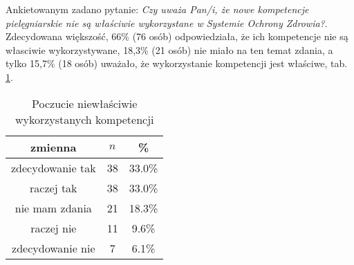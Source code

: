 
Ankietowanym zadano pytanie: \textit{Czy uważa Pan/i, że nowe kompetencje pielęgniarskie nie są właściwie wykorzystane w Systemie Ochrony Zdrowia?}.
Zdecydowana większość, 66\% (76 osób) odpowiedziała, że ich kompetencje nie są własciwie wykorzystywane, 18,3\% (21 osób) nie miało na ten temat zdania, a tylko 15,7\% (18 osób) uważało, że wykorzystanie kompetencji jest właściwe, tab. \ref{tab:Q21}.

\begin{table}[H]
\caption{Poczucie niewłaściwie wykorzystanych kompetencji}
\centering
\begin{tabular}{ | c | c | c |}
\hline
zmienna & $n$ & \% \\
\hline
zdecydowanie tak  &  38  & 33.0\% \\
\hline
raczej tak  &  38  & 33.0\% \\
\hline
nie mam zdania  &  21  & 18.3\% \\
\hline
raczej nie  &  11  & 9.6\% \\
\hline
zdecydowanie nie  &  7  & 6.1\% \\
\hline
\end{tabular}
\label{tab:Q21}
\end{table}
